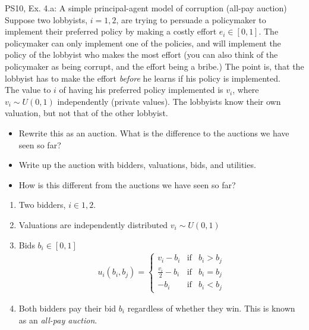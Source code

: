 \begin{frame}{PS10, Ex. 4.a: A simple principal-agent model of corruption (all-pay auction)}
    Suppose two lobbyists, $i = 1, 2$, are trying to persuade a policymaker to implement their preferred policy by making a costly effort $e_i\in[0, 1]$. The policymaker can only implement one of the policies, and will implement the policy of the lobbyist who makes the most effort (you can also think of the policymaker as being corrupt, and the effort being a bribe.) The point is, that the lobbyist has to make the effort \textit{before} he learns if his policy is implemented.\\\smallskip
    The value to $i$ of having his preferred policy implemented is $v_i$, where $v_i\sim U(0, 1)$ independently (private values). The lobbyists know their own valuation, but not that of the other lobbyist.
    \vspace{-4pt}
    \begin{itemize}
      \item[(a)] Rewrite this as an auction. What is the difference to the auctions we have seen so far?
    \end{itemize}
    \vspace{-8pt}
    \begin{multicols}{2}
      \begin{itemize}
        \item[Step 1:] Write up the auction with bidders, valuations, bids, and utilities.
        \item[Step 2:] How is this different from the auctions we have seen so far?
      \end{itemize}
      \vfill\null\columnbreak
      \begin{enumerate}
        \item Two bidders, $i\in1,2$.
        \item[] Valuations are independently distributed $v_i\sim U(0, 1)$
        \item[] Bids $b_i\in[0,1]$ \vspace{-6pt}
        \begin{align*}
          u_i(b_i,b_j)=\left\{\begin{array}{lcl}
            v_i-b_i           & \text{if} & b_i>b_j \\
            \frac{v_i}{2}-b_i & \text{if} & b_i=b_j \\
            -b_i              & \text{if} & b_i<b_j
          \end{array}\right.
        \end{align*}
        \item \vspace{-6pt} Both bidders pay their bid $b_i$ regardless of whether they win. This is known as an \textit{all-pay auction}.
      \end{enumerate}
      \vfill\null
    \end{multicols}
\end{frame}


